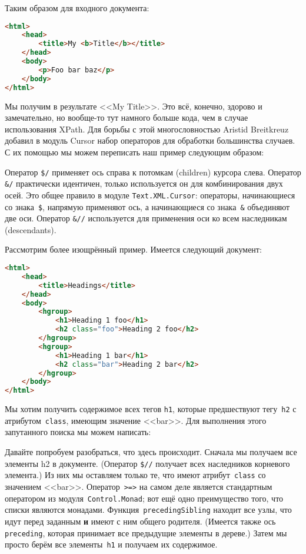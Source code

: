 Таким образом для входного документа:

\begin{lstlisting}[language=HTML]
<html>
    <head>
        <title>My <b>Title</b></title>
    </head>
    <body>
        <p>Foo bar baz</p>
    </body>
</html>
\end{lstlisting}

Мы получим в результате <<My Title>>. Это всё, конечно, здорово и замечательно,
но вообще-то тут намного больше кода, чем в случае использования XPath. Для
борьбы с этой многословностью Aristid Breitkreuz добавил в модуль Cursor набор
операторов для обработки большинства случаев. С их помощью мы можем переписать
наш пример следующим образом:


Оператор \lstinline!$/! применяет ось справа к потомкам (children) курсора
слева. Оператор \lstinline!&/! практически идентичен, только используется он
для комбинирования двух осей. Это общее правило в модуле
\lstinline!Text.XML.Cursor!: операторы, начинающиеся со знака~\lstinline!$!,
напрямую применяют ось, а начинающиеся со знака~\lstinline!&! объединяют две
оси. Оператор \lstinline!&//! используется для применения оси ко всем
наследникам (descendants).

Рассмотрим более изощрённый пример. Имеется следующий документ:

\begin{lstlisting}[language=HTML]
<html>
    <head>
        <title>Headings</title>
    </head>
    <body>
        <hgroup>
            <h1>Heading 1 foo</h1>
            <h2 class="foo">Heading 2 foo</h2>
        </hgroup>
        <hgroup>
            <h1>Heading 1 bar</h1>
            <h2 class="bar">Heading 2 bar</h2>
        </hgroup>
    </body>
</html>
\end{lstlisting}

Мы хотим получить содержимое всех тегов \lstinline!h1!, которые предшествуют
тегу~\lstinline!h2! с атрибутом~\lstinline!class!, имеющим значение <<bar>>.
Для выполнения этого запутанного поиска мы можем написать:


Давайте попробуем разобраться, что здесь происходит. Сначала мы получаем все
элементы h2 в документе. (Оператор \lstinline!$//! получает всех наследников
корневого элемента.) Из них мы оставляем только те, что имеют
атрибут~\lstinline!class! со значением <<bar>>. Оператор~\lstinline!>=>! на
самом деле является стандартным оператором из модуля~\lstinline!Control.Monad!;
вот ещё одно преимущество того, что списки являются монадами.
Функция~\lstinline!precedingSibling! находит все узлы, что идут перед заданным
\textbf{и} имеют с ним общего родителя. (Имеется также ось \lstinline!preceding!,
которая принимает все предыдущие элементы в дереве.) Затем мы просто берём все
элементы~\lstinline!h1! и получаем их содержимое.

